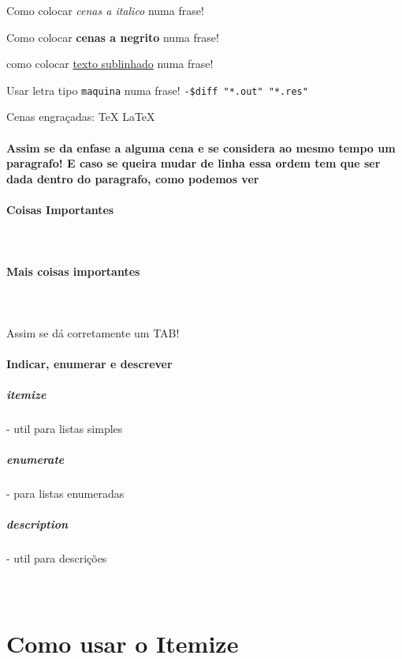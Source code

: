 \documentclass[a4paper,11pt]{report}%
\begin{document}
Como colocar \textsl {cenas a italico} numa frase!

Como colocar \textbf {cenas a negrito} numa frase! 

como colocar \underline {texto sublinhado} numa frase!

Usar letra tipo   \texttt{maquina} numa frase!
\texttt{-\$diff "*.out" "*.res"}

Cenas engraçadas:\newline
\TeX \newline
\LaTeX 

\paragraph{Assim se da enfase a alguma cena e se considera ao mesmo tempo um paragrafo! E caso se queira mudar de linha essa ordem tem que ser dada dentro do paragrafo, como podemos ver}

\paragraph {Coisas Importantes}
\paragraph{\ \ } 
\paragraph {Mais coisas importantes}
\paragraph{\ }  

\indent Assim se dá corretamente um TAB!

\newpage
\paragraph{Indicar, enumerar e descrever}

\subparagraph{\textbf{\textsl {itemize}}} - util para listas simples
\subparagraph{\textbf{\textsl {enumerate}}} - para listas enumeradas
\subparagraph{\textbf{\textsl {description}}} - util para descrições
\paragraph{\ \ \ \ }
\section{Como usar o Itemize}
\end{document}
